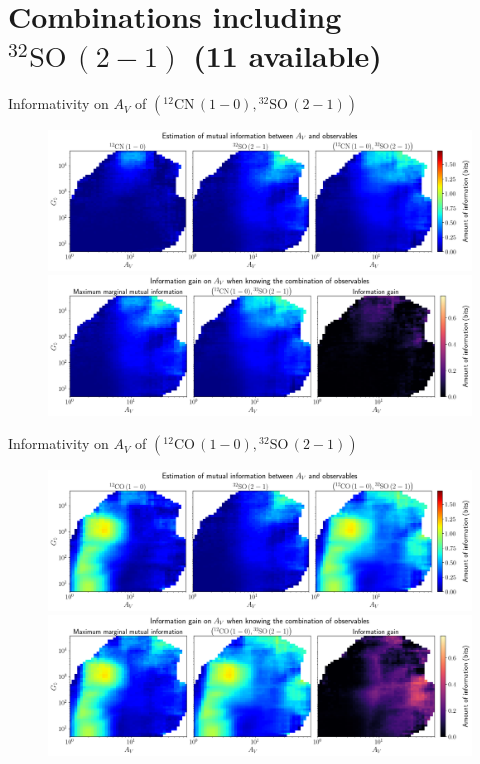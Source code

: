 \documentclass{beamer}
\begin{document}
\section{Combinations including $\mathrm{^{32}SO\,(2-1)}$ (11 available)}

\begin{frame}{Informativity on $A_V$ of $\left(\mathrm{^{12}CN\,(1-0)},\mathrm{^{32}SO\,(2-1)}\right)$}
    \begin{figure}
        \centering
        \includegraphics[width=0.95\linewidth]{../mi/av__12cn10_32so21_mi.png}
        \vfill
        \includegraphics[width=0.95\linewidth]{../mi/av__12cn10_32so21_mi_gain.png}
    \end{figure}
\end{frame}

\begin{frame}{Informativity on $A_V$ of $\left(\mathrm{^{12}CO\,(1-0)},\mathrm{^{32}SO\,(2-1)}\right)$}
    \begin{figure}
        \centering
        \includegraphics[width=0.95\linewidth]{../mi/av__12co10_32so21_mi.png}
        \vfill
        \includegraphics[width=0.95\linewidth]{../mi/av__12co10_32so21_mi_gain.png}
    \end{figure}
\end{frame}
\end{document}
